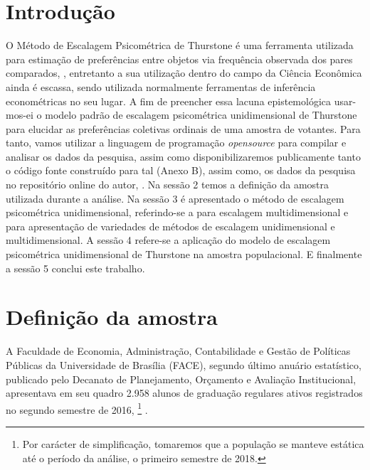 \documentclass[
	article,			%
	12pt,				%
	oneside,			%
	a4paper,			%
	english,			%
	brazil,				%
	]{abntex2}
\begin{document}
\section{Introdução}


O Método de Escalagem Psicométrica de Thurstone é uma ferramenta utilizada para estimação de preferências entre objetos via frequência observada dos pares comparados, , entretanto a sua utilização dentro do campo da Ciência Econômica ainda é escassa, sendo utilizada normalmente ferramentas de inferência econométricas no seu lugar. A fim de preencher essa lacuna epistemológica usar-mos-ei o modelo padrão de escalagem psicométrica unidimensional de Thurstone para elucidar as preferências coletivas ordinais de uma amostra de votantes. Para tanto, vamos utilizar a linguagem de programação \textit{opensource}  para compilar e analisar os dados da pesquisa, assim como disponibilizaremos publicamente tanto o código fonte construído para tal (Anexo B), assim como, os dados da pesquisa no repositório online do autor, . Na sessão 2 temos a definição da amostra utilizada durante a análise. Na sessão 3 é apresentado o método de escalagem psicométrica unidimensional, referindo-se a  para escalagem multidimensional e  para apresentação de variedades de métodos de escalagem unidimensional e  multidimensional. A sessão 4 refere-se a aplicação do modelo de escalagem psicométrica unidimensional de Thurstone na amostra populacional. E finalmente a sessão 5 conclui este trabalho. 



\section{Definição da amostra}


A Faculdade de Economia, Administração, Contabilidade e Gestão de Políticas Públicas da Universidade de Brasília (FACE), segundo último anuário estatístico, publicado pelo Decanato de Planejamento, Orçamento e Avaliação Institucional, apresentava em seu quadro 2.958 alunos de graduação regulares ativos registrados no segundo semestre de 2016, \footnote{Por carácter de simplificação, tomaremos que a população se manteve estática até o período da análise, o primeiro semestre de 2018.} .
\end{document}
